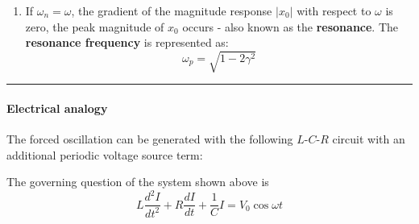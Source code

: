 \documentclass[12pt,a4paper]{article}
\begin{document}
\begin{tcolorbox}[breakable, title=Solution Procedure and Discussions]
\begin{enumerate}
	\item If $\omega_{n}=\omega$, the gradient of the magnitude response $\lvert x_0 \rvert$ with respect to $\omega$ is zero, the peak magnitude of $x_0$ occurs - also known as the \textbf{resonance}. The \textbf{resonance frequency} is represented as: 
    \[
        \omega_{p}=\sqrt{1-2\gamma^{2}}
    \]
\end{enumerate}

\end{tcolorbox}

\hrule \vspace{.1cm}
\paragraph{Electrical analogy} The forced oscillation can be generated with the following $L$-$C$-$R$ circuit with an additional periodic voltage source term:
\begin{figure}[H]
    \centering
\end{figure}
The governing question of the system shown above is
\[
    L \frac{d^2I}{dt^2} + R\frac{dI}{dt} + \frac{1}{C}I = V_0 \cos \omega t
\]
\end{document}
